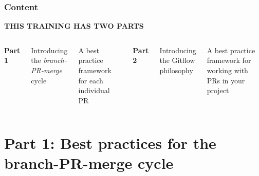 \documentclass[aspectratio=169]{beamer} %
\begin{document}
\begin{frame}
	\frametitle{Content}

	\Large\centering \textbf{THIS TRAINING HAS TWO PARTS}

	\vspace{.8em}

	\begin{columns}[T]



		\centering
		\large \textbf{Part 1}

		\vspace{1em}

		\raggedright
		\normalfont Introducing the
		\textit{branch-PR-merge} cycle

		\vspace{.5em}

		\normalfont A best practice framework for each individual PR



		\centering
		\large \textbf{Part 2}

		\vspace{1em}

		\raggedright
		\normalfont Introducing the Gitflow philosophy
		
		\vspace{.5em}
		
		\normalfont A best practice framework for working with PRs in your project






	\end{columns}

	\end{frame}



\section{Part 1: \newline Best practices for the branch-PR-merge cycle}
\end{document}
